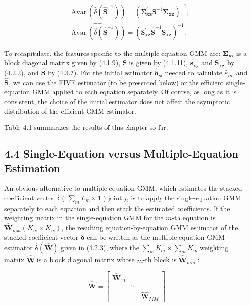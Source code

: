 \documentclass[10pt]{article}
\begin{document}
\begin{align*}
& \operatorname{Avar}\left(\hat{\delta}\left(\widehat{\mathbf{S}}^{-1}\right)\right)=\left(\boldsymbol{\Sigma}_{\mathbf{x z}}^{\prime} \mathbf{S}^{-1} \boldsymbol{\Sigma}_{\mathbf{x z}}\right)^{-1},  \tag{4.3.3}\\
& \widehat{\operatorname{Avar}\left(\hat{\delta}\left(\widehat{\mathbf{S}}^{-1}\right)\right)}=\left(\mathbf{S}_{\mathbf{x z}}^{\prime} \widehat{\mathbf{S}}^{-1} \mathbf{S}_{\mathbf{x z}}\right)^{-1} . \tag{4.3.4}
\end{align*}


To recapitulate, the features specific to the multiple-equation GMM are: $\boldsymbol{\Sigma}_{\mathbf{x z}}$ is a block diagonal matrix given by (4.1.9), $\mathbf{S}$ is given by (4.1.11), $\mathbf{s}_{\mathbf{x y}}$ and $\mathbf{S}_{\mathbf{x z}}$ by (4.2.2), and $\widehat{\mathbf{S}}$ by (4.3.2). For the initial estimator $\hat{\boldsymbol{\delta}}_{m}$ needed to calculate $\hat{\varepsilon}_{i m}$ and $\widehat{\mathbf{S}}$, we can use the FIVE estimator (to be presented below) or the efficient single-equation GMM applied to each equation separately. Of course, as long as it is consistent, the choice of the initial estimator does not affect the asymptotic distribution of the efficient GMM estimator.

Table 4.1 summarizes the results of this chapter so far.

\subsection*{4.4 Single-Equation versus Multiple-Equation Estimation}
An obvious alternative to multiple-equation GMM, which estimates the stacked coefficient vector $\delta$ ( $\sum_{m} L_{m} \times 1$ ) jointly, is to apply the single-equation GMM separately to each equation and then stack the estimated coefficients. If the weighting matrix in the single-equation GMM for the $m$-th equation is $\widehat{\mathbf{W}}_{m m}\left(K_{m} \times K_{m}\right)$, the resulting equation-by-equation GMM estimator of the stacked coefficient vector $\boldsymbol{\delta}$ can be written as the multiple-equation GMM estimator $\hat{\boldsymbol{\delta}}(\widehat{\mathbf{W}})$ given in (4.2.3), where the $\sum_{m} K_{m} \times \sum_{m} K_{m}$ weighting matrix $\widehat{\mathbf{W}}$ is a block diagonal matrix whose $m$-th block is $\widehat{\mathbf{W}}_{m m}$ :

\[
\widehat{\mathbf{W}}=\left[\begin{array}{lll}
\widehat{\mathbf{W}}_{11} & &  \tag{4.4.1}\\
& \ddots & \\
& & \widehat{\mathbf{W}}_{M M}
\end{array}\right]
\]
\end{document}
